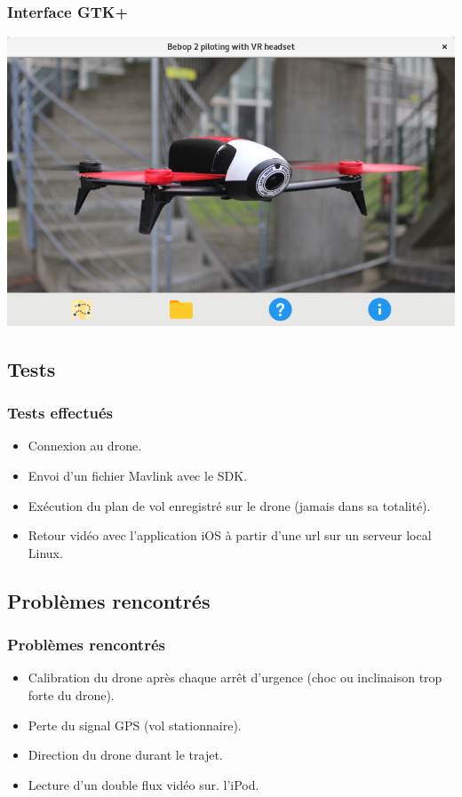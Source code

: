 \documentclass{beamer}
\begin{document}
	
	
	\begin{frame}
		\frametitle{Interface GTK+}
		\includegraphics[scale=0.4]{Architecture_logicielle_composants/GUI-v2.png}	
	
	\end{frame}
	
	
	\begin{frame}
		\section{Tests}
		\begin{center}
		\frametitle{Tests effectués}
           	\begin{itemize}
                \item Connexion au drone.
                \item Envoi d'un fichier Mavlink avec le SDK.
                \item Exécution du plan de vol enregistré sur le drone (jamais dans sa totalité).
                \item Retour vidéo avec l'application iOS à partir d'une url sur un serveur local Linux.
            \end{itemize}
		\end{center}
	\end{frame}
	
	
	
	\begin{frame}
		\section{Problèmes rencontrés}
		\begin{center}
		\frametitle{Problèmes rencontrés}
             \begin{itemize}
                \item Calibration du drone après chaque arrêt d'urgence (choc ou inclinaison trop forte du drone).
                \item Perte du signal GPS (vol stationnaire).
                \item Direction du drone durant le trajet.
                \item Lecture d'un double flux vidéo sur. l'iPod.
            \end{itemize}
		\end{center}
	\end{frame}
	
	
\end{document}
